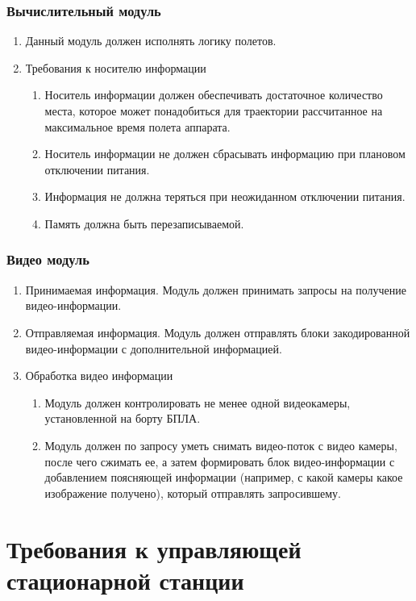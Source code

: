 \documentclass[utf8]{report}
\begin{document}
\subsubsection{Вычислительный модуль}
\begin{enumerate}
  \item Данный модуль должен исполнять логику полетов.
  \item Требования к носителю информации
  \begin{enumerate}
    \item Носитель информации должен обеспечивать достаточное количество места, которое может понадобиться для траектории рассчитанное на максимальное время полета аппарата.
    \item Носитель информации не должен сбрасывать информацию при плановом отключении питания.
    \item Информация не должна теряться при неожиданном отключении питания.
    \item Память должна быть перезаписываемой.
  \end{enumerate}
\end{enumerate}

\subsubsection{Видео модуль}
\begin{enumerate}
  \item Принимаемая информация. Модуль должен принимать запросы на получение видео-информации.
  \item Отправляемая информация. Модуль должен отправлять блоки закодированной видео-информации с дополнительной информацией.
  \item Обработка видео информации
  \begin{enumerate}
    \item Модуль должен контролировать не менее одной видеокамеры, установленной на борту БПЛА.
    \item Модуль должен по запросу уметь снимать видео-поток с видео камеры, после чего сжимать ее, а затем формировать блок видео-информации с добавлением поясняющей информации (например, с какой камеры какое изображение получено), который отправлять запросившему.
  \end{enumerate}
\end{enumerate}

\section{Требования к управляющей стационарной станции}
\end{document}
